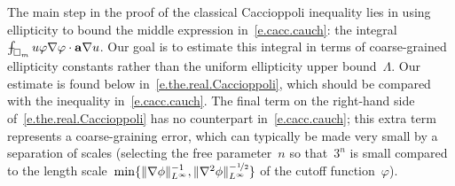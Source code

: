 \documentclass[11pt,twoside]{article} %
\let\oldsquare\square %
\renewcommand{\square}{\oldsquare}
\numberwithin{equation}{section}
\theoremstyle{definition}
\renewcommand{\a}{\mathbf{a}}
\newcommand{\cu}{\square}
\def\Xint#1{\mathchoice
{\XXint\displaystyle\textstyle{#1}}%
{\XXint\textstyle\scriptstyle{#1}}%
{\XXint\scriptstyle\scriptscriptstyle{#1}}%
{\XXint\scriptscriptstyle\scriptscriptstyle{#1}}%
\!\int}
\def\XXint#1#2#3{{\setbox0=\hbox{$#1{#2#3}{\int}$}
\vcenter{\hbox{$#2#3$}}\kern-.5\wd0}}
\def\fint{\Xint-}
\begin{document}
The main step in the proof of the classical Caccioppoli inequality lies in using ellipticity to bound the middle expression in~\eqref{e.cacc.cauch}: the integral~$\fint_{\cu_m} u\varphi \nabla \varphi \cdot \a\nabla u$. Our goal is to estimate this integral in terms of coarse-grained ellipticity constants rather than  the uniform ellipticity upper bound~$\Lambda$. Our estimate is found below in~\eqref{e.the.real.Caccioppoli}, which should be compared with the inequality in~\eqref{e.cacc.cauch}. The final term on the right-hand side of~\eqref{e.the.real.Caccioppoli} has no counterpart in~\eqref{e.cacc.cauch}; this extra term represents a coarse-graining error, which can typically be made very small by a separation of scales (selecting the free parameter~$n$ so that~$3^n$ is small compared to the length scale~$\min\{ \| \nabla  \phi\|_{L^\infty}^{-1}, \| \nabla^2  \phi\|_{L^\infty}^{-\nicefrac12} \}$ of the cutoff function~$\varphi$).
\end{document}
